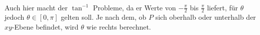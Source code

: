 \\
\begin{minipage}{0.49\linewidth}
    Auch hier macht der $\tan^{-1}$ Probleme, da er Werte von $-\frac{\pi}{2}$ bis $\frac{\pi}{2}$ liefert, für $\theta$ jedoch $\theta \in [0, \pi]$ gelten soll.
    Je nach dem, ob $P$ sich oberhalb oder unterhalb der $xy$-Ebene befindet, wird $\theta$ wie rechts berechnet.
\end{minipage}
\hfill
\begin{minipage}{0.49\linewidth}
    \begin{center}
    \end{center}
\end{minipage}

